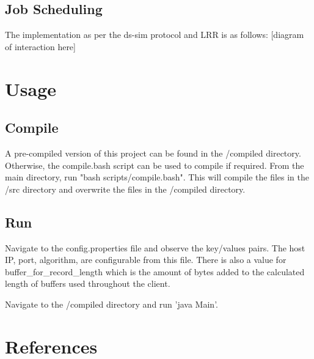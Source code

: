 \documentclass[a4paper]{article}
\begin{document}
\subsection{Job Scheduling}
The implementation as per the ds-sim protocol and LRR is as follows:
[diagram of interaction here]

\section{Usage}
\label{sec:section5}
\subsection{Compile}
A pre-compiled version of this project can be found in the /compiled directory. Otherwise, the compile.bash script can be used to compile if required. From the main directory, run "bash scripts/compile.bash". This will compile the files in the /src directory and overwrite the files in the /compiled directory.

\subsection{Run}
Navigate to the config.properties file and observe the key/values pairs. The host IP, port, algorithm, are configurable from this file. There is also a value for buffer\_for\_record\_length which is the amount of bytes added to the calculated length of buffers used throughout the client. 

Navigate to the /compiled directory and run 'java Main'.

\section{References}
\end{document}

